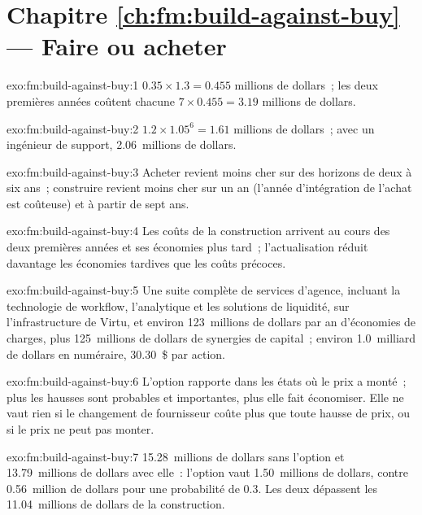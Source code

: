 \section*{Chapitre \ref{ch:fm:build-against-buy} --- Faire ou acheter}

\begin{solution}{exo:fm:build-against-buy:1}
$0.35\times1.3=0.455$ millions de dollars~; les deux premières années coûtent chacune $7\times0.455=3.19$ millions de dollars.
\end{solution}

\begin{solution}{exo:fm:build-against-buy:2}
$1.2\times1.05^6=1.61$ millions de dollars~; avec un ingénieur de support, 2.06~millions de dollars.
\end{solution}

\begin{solution}{exo:fm:build-against-buy:3}
Acheter revient moins cher sur des horizons de deux à six ans~; construire revient moins cher sur un an (l'année d'intégration de l'achat est coûteuse) et à partir de sept
ans.
\end{solution}

\begin{solution}{exo:fm:build-against-buy:4}
Les coûts de la construction arrivent au cours des deux premières années et ses économies plus tard~; l'actualisation réduit davantage les économies tardives que les coûts précoces.
\end{solution}

\begin{solution}{exo:fm:build-against-buy:5}
Une suite complète de services d'agence, incluant la technologie de workflow, l'analytique et les solutions de liquidité, sur l'infrastructure de Virtu, et environ
123~millions de dollars par an d'économies de charges, plus 125~millions de dollars de synergies de capital~; environ 1.0~milliard de dollars en numéraire, 30.30~\$ par action.
\end{solution}

\begin{solution}{exo:fm:build-against-buy:6}
L'option rapporte dans les états où le prix a monté~; plus les hausses sont probables et importantes, plus elle fait économiser. Elle ne vaut rien si le changement
de fournisseur coûte plus que toute hausse de prix, ou si le prix ne peut pas monter.
\end{solution}

\begin{solution}{exo:fm:build-against-buy:7}
15.28~millions de dollars sans l'option et 13.79~millions de dollars avec elle~: l'option vaut 1.50~millions de dollars, contre 0.56~million de dollars pour une probabilité de 0.3.
Les deux dépassent les 11.04~millions de dollars de la construction.
\end{solution}

